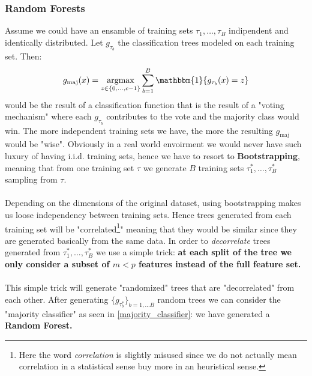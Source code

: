 \subsubsection*{Random Forests}
Assume we could have an ensamble of training sets \(\tau_1, \dots , \tau_B\) indipendent and identically distributed. Let \(g_{\tau_b}\) the classification trees modeled on each training set. Then:
\begin{equation}
    \label{majority_classifier}
    g_{\text{maj}}(x) = \argmax_{z \in \{0, \dots, c-1\}}  \sum \limits_{b= 1}^{B} \mathbbm{1}\{g_{\tau_b}(x) = z\}
\end{equation} 
would be the result of a classification function that is the result of a "voting mechanism" where each \(g_{\tau_b}\) contributes to the vote and the majority class would win. The more independent training sets we have, the more the resulting \(g_{\text{maj}}\) would be "wise". Obviously in a real world envoirment we would never have such luxury of having i.i.d. training sets, hence we have to resort to \textbf{Bootstrapping}, meaning that from one training set \(\tau\) we generate \(B\) training sets \(\tau^*_1, \dots , \tau^*_B\) sampling from \(\tau\). \\
\\
Depending on the dimensions of the original dataset, using bootstrapping makes us loose independency between training sets. Hence trees generated from each training set will be "correlated\footnote{Here the word \textit{correlation} is slightly misused since we do not actually mean correlation in a statistical sense buy more in an heuristical sense.}" meaning that they would be similar since they are generated basically from the same data. In order to \textit{decorrelate} trees generated from \(\tau^*_1, \dots , \tau^*_B\) we use a simple trick: \textbf{at each split of the tree we only consider a subset of \(m< p\) features instead of the full feature set.}
\\
\\
This simple trick will generate "randomized" trees that are "decorrelated" from each other. After generating \(\{g_{\tau^*_b}\}_{b = 1, \dots B}\) random trees we can consider the "majority classifier" as seen in \ref{majority_classifier}: we have generated a \textbf{Random Forest.}
